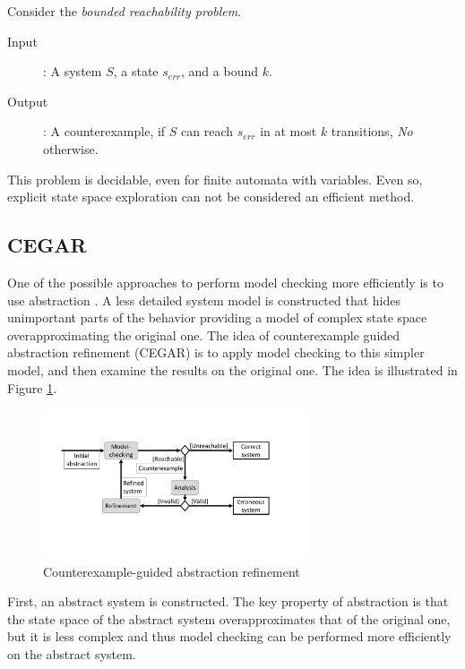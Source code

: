 Consider the \emph{bounded reachability problem}.
\begin{description}
	\item[Input]: A system $S$, a state $s_{err}$, and a bound $k$.
	\item[Output]: A counterexample, if $S$ can reach $s_{err}$ in at most $k$ transitions, \emph{No} otherwise.
\end{description}

This problem is decidable, even for finite automata with variables. Even so, explicit state space exploration can not be considered an efficient method.

\subsection{CEGAR}

One of the possible approaches to perform model checking more efficiently is to use abstraction \cite{Clarke:1994:MCA}. A less detailed system model is constructed that hides unimportant parts of the behavior providing a model of complex state space overapproximating the original one. The idea of counterexample guided abstraction refinement (CEGAR) \cite{clarke2003counterexample} is to apply 
model checking to this simpler model, and then examine the results on the original one. The idea is illustrated in
Figure \ref{fig:cegar}.


\begin{figure}
	\centering
	\includegraphics [width=0.7\textwidth] {include/figures/cegar_flow_black}
	\caption{Counterexample-guided abstraction refinement}
	\label{fig:cegar}
\end{figure}


First, an abstract system is constructed. The key property of abstraction is
that the state space of the abstract system overapproximates that of the original
one, but it is less complex and thus model checking can be performed more efficiently on the abstract system.

